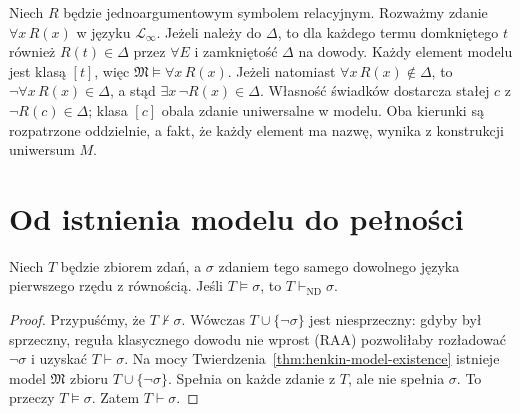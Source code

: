 \begin{przyklad}
Niech $R$ będzie jednoargumentowym symbolem relacyjnym.
Rozważmy zdanie $\forall x\,R(x)$ w języku $\mathcal L_{\infty}$.
Jeżeli należy do $\Delta$, to dla każdego termu domkniętego $t$
również $R(t)\in\Delta$ przez $\forall E$ i zamkniętość $\Delta$ na dowody.
Każdy element modelu jest klasą $[t]$, więc $\mathfrak M\models\forall x\,R(x)$.
Jeżeli natomiast $\forall x\,R(x)\notin\Delta$, to
$\neg\forall x\,R(x)\in\Delta$, a stąd
$\exists x\,\neg R(x)\in\Delta$.
Własność świadków dostarcza stałej $c$ z $\neg R(c)\in\Delta$;
klasa $[c]$ obala zdanie uniwersalne w modelu.
Oba kierunki są rozpatrzone oddzielnie, a fakt, że każdy element ma nazwę,
wynika z konstrukcji uniwersum $M$.
\end{przyklad}

\section{Od istnienia modelu do pełności}\label{sec:henkin-completeness}
\begin{twierdzenie}\label{thm:henkin-completeness-sentences}
Niech $T$ będzie zbiorem zdań, a $\sigma$ zdaniem tego samego dowolnego języka pierwszego rzędu z równością. Jeśli $T\models\sigma$, to $T\vdash_{\mathrm{ND}}\sigma$.
\end{twierdzenie}
\begin{proof}
Przypuśćmy, że $T\nvdash\sigma$. Wówczas $T\cup\{\neg\sigma\}$ jest niesprzeczny: gdyby był sprzeczny, reguła klasycznego dowodu nie wprost (RAA) pozwoliłaby rozładować $\neg\sigma$ i uzyskać $T\vdash\sigma$. Na mocy Twierdzenia~\ref{thm:henkin-model-existence} istnieje model $\mathfrak M$ zbioru $T\cup\{\neg\sigma\}$. Spełnia on każde zdanie z $T$, ale nie spełnia $\sigma$. To przeczy $T\models\sigma$. Zatem $T\vdash\sigma$.
\end{proof}

